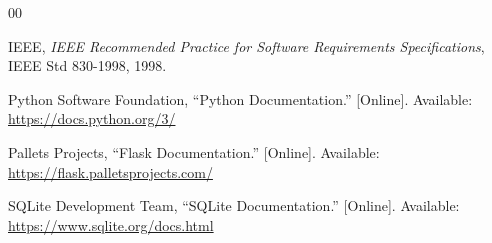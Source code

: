 \documentclass[conference]{IEEEtran}
\begin{document}
\begin{thebibliography}{00}

IEEE, \emph{IEEE Recommended Practice for Software Requirements Specifications}, IEEE Std 830-1998, 1998.

Python Software Foundation, ``Python Documentation.''
[Online]. Available: \url{https://docs.python.org/3/}

Pallets Projects, ``Flask Documentation.''
[Online]. Available: \url{https://flask.palletsprojects.com/}

SQLite Development Team, ``SQLite Documentation.''
[Online]. Available: \url{https://www.sqlite.org/docs.html}

\end{thebibliography}

\balance
\end{document}

